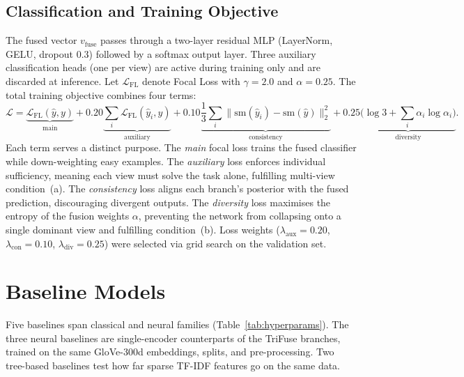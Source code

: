 \documentclass[10pt,twocolumn,a4paper]{article}
\begin{document}
\subsection{Classification and Training Objective}\label{subsec:training_obj}

The fused vector $v_{\mathrm{fuse}}$ passes through a two-layer residual MLP (LayerNorm, GELU, dropout 0.3) followed by a softmax output layer. Three auxiliary classification heads (one per view) are active during training only and are discarded at inference. Let $\mathcal{L}_{\mathrm{FL}}$ denote Focal Loss \citep{ref23} with $\gamma{=}2.0$ and $\alpha{=}0.25$. The total training objective combines four terms:
\begin{equation}
\mathcal{L} = \underbrace{\mathcal{L}_{\mathrm{FL}}(\hat{y}, y)}_{\text{main}} + 0.20\underbrace{\sum_i \mathcal{L}_{\mathrm{FL}}(\hat{y}_i, y)}_{\text{auxiliary}} + 0.10\underbrace{\frac{1}{3}\sum_i \|\mathrm{sm}(\hat{y}_i) - \mathrm{sm}(\hat{y})\|_2^2}_{\text{consistency}} + 0.25\underbrace{\bigl(\log 3 + \sum_i \alpha_i \log \alpha_i\bigr)}_{\text{diversity}}.
\end{equation}
Each term serves a distinct purpose. The \emph{main} focal loss trains the fused classifier while down-weighting easy examples. The \emph{auxiliary} loss enforces individual sufficiency, meaning each view must solve the task alone, fulfilling multi-view condition~(a). The \emph{consistency} loss aligns each branch's posterior with the fused prediction, discouraging divergent outputs. The \emph{diversity} loss maximises the entropy of the fusion weights $\alpha$, preventing the network from collapsing onto a single dominant view and fulfilling condition~(b). Loss weights ($\lambda_{\mathrm{aux}}{=}0.20$, $\lambda_{\mathrm{con}}{=}0.10$, $\lambda_{\mathrm{div}}{=}0.25$) were selected via grid search on the validation set.

\section{Baseline Models}\label{sec:baselines}

Five baselines span classical and neural families (Table~\ref{tab:hyperparams}). The three neural baselines are single-encoder counterparts of the TriFuse branches, trained on the same GloVe-300d embeddings, splits, and pre-processing. Two tree-based baselines test how far sparse TF-IDF features go on the same data.
\end{document}
